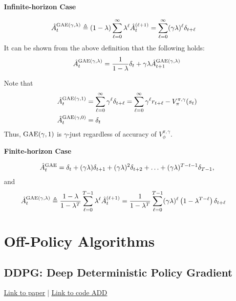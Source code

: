 \documentclass{article}
\begin{document}
\noindent\textbf{Infinite-horizon Case}

\begin{align*}
    \hat A_t^{\rm{GAE}(\gamma,\lambda)} &\triangleq (1-\lambda) \sum_{\ell = 0}^\infty \lambda^{\ell} \hat A_t^{(\ell + 1)}  = \sum_{\ell = 0}^\infty (\gamma \lambda)^{\ell} \delta_{t+\ell}
\end{align*}
It can be shown from the above definition that the following holds:
\begin{align*}
     \hat A_t^{\rm{GAE}(\gamma,\lambda)} = \frac{1}{1-\lambda}\delta_t + \gamma \lambda \hat A_{t+1}^{\rm{GAE}(\gamma,\lambda)}
\end{align*}

Note that 
\begin{align*}
    \hat A_t^{\rm{GAE}(\gamma,1)} &= \sum_{\ell = 0}^\infty \gamma^\ell \delta_{t+\ell} = \sum_{\ell = 0}^\infty \gamma^\ell r_{t+\ell} - V_\pi^{\pi, \gamma}(s_t)\\
    \hat A_t^{\rm{GAE}(\gamma,0)} &= \delta_t
\end{align*}
Thus, $\rm{GAE}(\gamma, 1)$ is $\gamma$-just regardless of accuracy of $V_\phi^{\pi, \gamma}$.

\vspace{10pt}
\noindent\textbf{Finite-horizon Case}

\begin{align*}
\hat{A}_t^{\rm GAE} = \delta_t + (\gamma \lambda) \delta_{t+1} + (\gamma \lambda)^2 \delta_{t+2} + \ldots + (\gamma \lambda)^{T-t-1} \delta_{T-1},
\end{align*}
and
\begin{align*}
    \hat A_t^{\rm{GAE}(\gamma,\lambda)} &\triangleq \frac{1 - \lambda}{1 - \lambda^T} \sum_{\ell=0}^{T-1} \lambda^\ell \hat A_t^{(\ell+1)} = \frac{1}{1 - \lambda^T}\sum_{\ell=0}^{T-1} (\gamma \lambda)^\ell \left(1 - \lambda^{T-\ell}\right)\delta_{t+\ell}
\end{align*}

\newpage
\section{Off-Policy Algorithms}
\subsection{DDPG: Deep Deterministic Policy Gradient}\label{sec:DDPG}
\href{https://arxiv.org/abs/1509.02971}{\underline{Link to paper}} | \href{https://arxiv.org/abs/1509.02971}{\underline{Link to code ADD}} 
\end{document}
